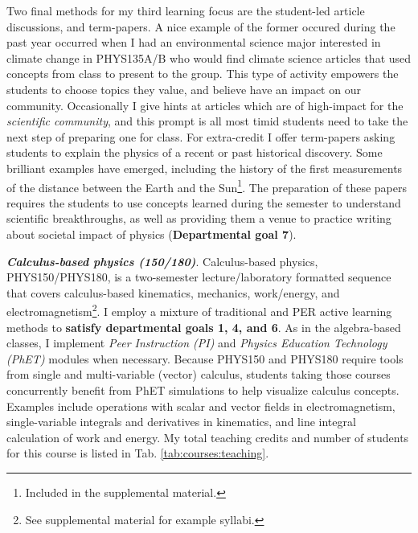 \documentclass[../../../main.tex]{subfiles}
\begin{document}
Two final methods for my third learning focus are the student-led article discussions, and term-papers.  A nice example of the former occured during the past year occurred when I had an environmental science major interested in climate change in PHYS135A/B who would find climate science articles that used concepts from class to present to the group.  This type of activity empowers the students to choose topics they value, and believe have an impact on our community.  Occasionally I give hints at articles which are of high-impact for the \textit{scientific community}, and this prompt is all most timid students need to take the next step of preparing one for class.  For extra-credit I offer term-papers asking students to explain the physics of a recent or past historical discovery.  Some brilliant examples have emerged, including the history of the first measurements of the distance between the Earth and the Sun\footnote{Included in the supplemental material.}.  The preparation of these papers requires the students to use concepts learned during the semester to understand scientific breakthroughs, as well as providing them a venue to practice writing about societal impact of physics (\textbf{Departmental goal 7}).  \\ \hspace{0.1cm}

\textbf{\textit{Calculus-based physics (150/180)}}. Calculus-based physics, PHYS150/PHYS180, is a two-semester lecture/laboratory formatted sequence that covers calculus-based kinematics, mechanics, work/energy, and electromagnetism\footnote{See supplemental material for example syllabi.}.  I employ a mixture of traditional and PER active learning methods to \textbf{satisfy departmental goals 1, 4, and 6}.  As in the algebra-based classes, I implement \textit{Peer Instruction (PI)} \cite{mazur2013peer} and \textit{Physics Education Technology (PhET)} \cite{phet} modules when necessary.  Because PHYS150 and PHYS180 require tools from single and multi-variable (vector) calculus, students taking those courses concurrently benefit from PhET simulations to help visualize calculus concepts.  Examples include operations with scalar and vector fields in electromagnetism, single-variable integrals and derivatives in kinematics, and line integral calculation of work and energy. My total teaching credits and number of students for this course is listed in Tab. \ref{tab:courses:teaching}. \\ \hspace{0.1cm}
\end{document}
